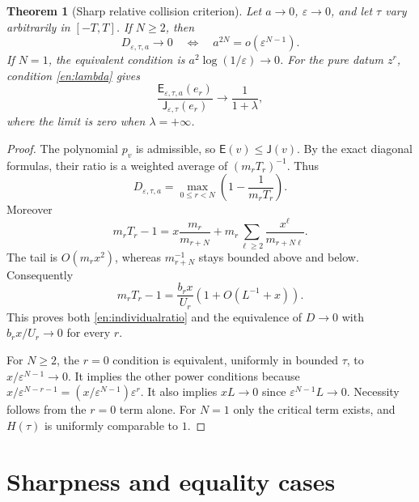 \documentclass[12pt]{amsart}
\newtheorem{thm}{Theorem}[section]
\theoremstyle{definition}
\theoremstyle{remark}
\numberwithin{equation}{section}
\newcommand{\Cost}{\mathsf E}
\newcommand{\JetCost}{\mathsf J}
\theoremstyle{definition}
\begin{document}
\begin{thm}[Sharp relative collision criterion]\label{en:criterion}
Let $a\to0$, $\varepsilon\to0$, and let $\tau$ vary arbitrarily in
$[-T,T]$. If $N\ge2$, then
\begin{equation}\label{en:criterionN}
 D_{\varepsilon,\tau,a}\longrightarrow0
 \quad\Longleftrightarrow\quad
 a^{2N}=o(\varepsilon^{N-1}).
\end{equation}
If $N=1$, the equivalent condition is
$a^2\log(1/\varepsilon)\to0$.
For the pure datum $z^r$, condition \eqref{en:lambda} gives
\begin{equation}\label{en:individualratio}
 \frac{\Cost_{\varepsilon,\tau,a}(e_r)}
 {\JetCost_{\varepsilon,\tau}(e_r)}
 \longrightarrow\frac{1}{1+\lambda},
\end{equation}
where the limit is zero when $\lambda=+\infty$.
\end{thm}
\begin{proof}
The polynomial $p_v$ is admissible, so $\Cost(v)\le\JetCost(v)$.
By the exact diagonal formulas, their ratio is a weighted average of
$(m_rT_r)^{-1}$. Thus
\begin{equation}\label{en:exactdefect}
 D_{\varepsilon,\tau,a}
 =\max_{0\le r<N}\left(1-\frac1{m_rT_r}\right).
\end{equation}
Moreover
\[
 m_rT_r-1=x\frac{m_r}{m_{r+N}}
  +m_r\sum_{\ell\ge2}\frac{x^\ell}{m_{r+N\ell}}.
\]
The tail is $O(m_rx^2)$, whereas $m_{r+N}^{-1}$ stays bounded
above and below. Consequently
\begin{equation}\label{en:jetlambda}
 m_rT_r-1=\frac{b_rx}{U_r}(1+O(L^{-1}+x)).
\end{equation}
This proves both \eqref{en:individualratio} and the equivalence of
$D\to0$ with $b_rx/U_r\to0$ for every $r$.

For $N\ge2$, the $r=0$ condition is equivalent, uniformly in bounded
$\tau$, to $x/\varepsilon^{N-1}\to0$. It implies the other power
conditions because
$x/\varepsilon^{N-r-1}=(x/\varepsilon^{N-1})\varepsilon^r$.
It also implies $xL\to0$ since $\varepsilon^{N-1}L\to0$.
Necessity follows from the $r=0$ term alone. For $N=1$ only the
critical term exists, and $H(\tau)$ is uniformly comparable to $1$.
\end{proof}

\section{Sharpness and equality cases}\label{en:sharpsec}
\end{document}
